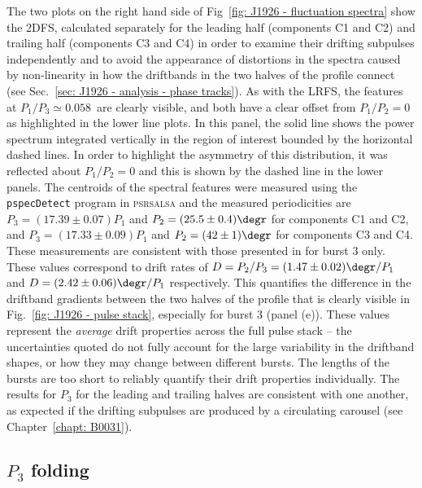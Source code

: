 The two plots on the right hand side of Fig~\ref{fig: J1926 - fluctuation spectra} show the 2DFS, calculated separately for the leading half (components C1 and C2) and trailing half (components C3 and C4) in order to examine their drifting subpulses independently and to avoid the appearance of distortions in the spectra caused by non-linearity in how the driftbands in the two halves of the profile connect (see Sec.~\ref{sec: J1926 - analysis - phase tracks}). As with the LRFS, the features at $P_1/P_3 \simeq 0.058$~are clearly visible, and both have a clear offset from $P_1/P_2 = 0$ as highlighted in the lower line plots. In this panel, the solid line shows the power spectrum integrated vertically in the region of interest bounded by the horizontal dashed lines. In order to highlight the asymmetry of this distribution, it was reflected about $P_1/P_2 = 0$ and this is shown by the dashed line in the lower panels. The centroids of the spectral features were measured using the \texttt{pspecDetect} program in \textsc{psrsalsa} and the measured periodicities are $P_3 = (17.39 \pm 0.07)P_1$ and $P_2 = (25.5 \pm 0.4)\degr$ for components C1 and C2, and $P_3 = (17.33 \pm 0.09)P_1$ and $P_2 = (42\pm 1)\degr$ for components C3 and C4. These measurements are consistent with those presented in \citet{ZLH+2019} for burst 3 only. These values correspond to drift rates of $D = P_2 / P_3 = (1.47 \pm 0.02)\degr/P_1$ and $D = (2.42 \pm 0.06)\degr/P_1$ respectively. This quantifies the difference in the driftband gradients between the two halves of the profile that is clearly visible in Fig.~\ref{fig: J1926 - pulse stack}, especially for burst 3 (panel (e)). These values represent the \textit{average} drift properties across the full pulse stack -- the uncertainties quoted do not fully account for the large variability in the driftband shapes, or how they may change between different bursts. The lengths of the bursts are too short to reliably quantify their drift properties individually. The results for $P_3$ for the leading and trailing halves are consistent with one another, as expected if the drifting subpulses are produced by a circulating carousel (see Chapter~\ref{chapt: B0031}).




\subsection{\texorpdfstring{$P_3$}{P3} folding}
\label{sec: J1926 - analysis - P3 folding}

